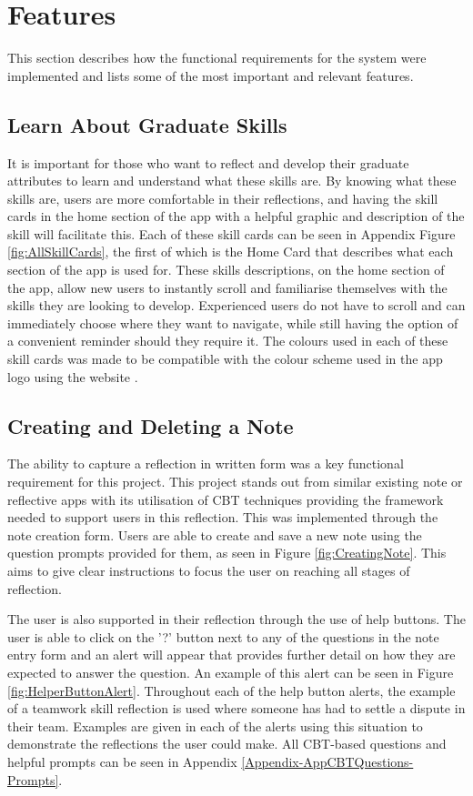 \documentclass{l4proj}
\begin{document}
\section{Features}

This section describes how the functional requirements for the system were implemented and lists some of the most important and relevant features. 

\subsection{Learn About Graduate Skills}

It is important for those who want to reflect and develop their graduate attributes to learn and understand what these skills are. By knowing what these skills are, users are more comfortable in their reflections, and having the skill cards in the home section of the app with a helpful graphic and description of the skill will facilitate this. Each of these skill cards can be seen in Appendix Figure \ref{fig:AllSkillCards}, the first of which is the Home Card that describes what each section of the app is used for. These skills descriptions, on the home section of the app, allow new users to instantly scroll and familiarise themselves with the skills they are looking to develop. Experienced users do not have to scroll and can immediately choose where they want to navigate, while still having the option of a convenient reminder should they require it. The colours used in each of these skill cards was made to be compatible with the colour scheme used in the app logo using the website \citet{coolersco_coolors_2021}.

\subsection{Creating and Deleting a Note}

The ability to capture a reflection in written form was a key functional requirement for this project. This project stands out from similar existing note or reflective apps with its utilisation of CBT techniques providing the framework needed to support users in this reflection. This was implemented through the note creation form. Users are able to create and save a new note using the question prompts provided for them, as seen in Figure \ref{fig:CreatingNote}. This aims to give clear instructions to focus the user on reaching all stages of reflection. 

The user is also supported in their reflection through the use of help buttons. The user is able to click on the '?' button next to any of the questions in the note entry form and an alert will appear that provides further detail on how they are expected to answer the question. An example of this alert can be seen in Figure \ref{fig:HelperButtonAlert}. Throughout each of the help button alerts, the example of a teamwork skill reflection is used where someone has had to settle a dispute in their team. Examples are given in each of the alerts using this situation to demonstrate the reflections the user could make. All CBT-based questions and helpful prompts can be seen in Appendix \ref{Appendix-AppCBTQuestions-Prompts}.
\end{document}
